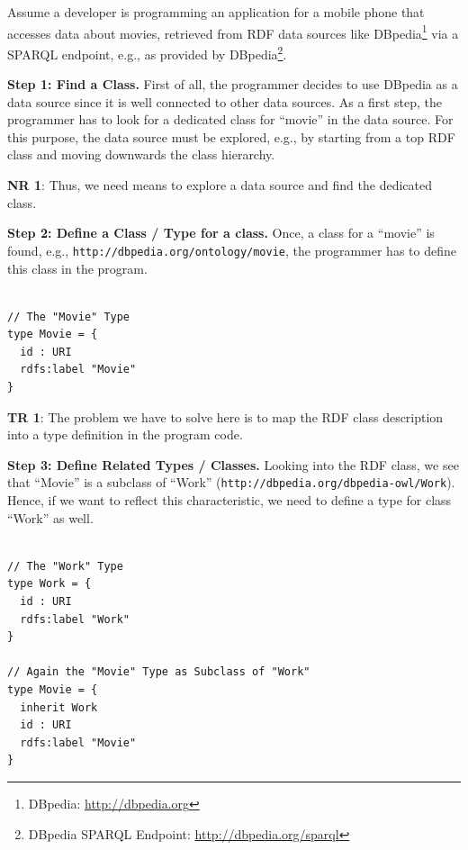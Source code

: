 \documentclass{llncs} %
\newcommand{\nr}[1]{\textbf{NR #1}}
\newcommand{\tr}[1]{\textbf{TR #1}}
\begin{document}
Assume a developer is programming an application for a mobile phone that accesses data about movies, retrieved
from RDF data sources like DBpedia\footnote{DBpedia: \url{http://dbpedia.org}} via a SPARQL endpoint,
e.g., as provided by DBpedia\footnote{DBpedia SPARQL Endpoint: \url{http://dbpedia.org/sparql}}.

\vspace{0.8em}
\noindent
\textbf{Step 1: Find a Class.}
First of all, the programmer decides to use DBpedia as a data source since it is well connected to other
data sources. As a first step, the programmer has to look for a dedicated class for ``movie'' in the data source.
For this purpose, the data source must be explored, e.g., by starting from a top RDF class and moving downwards the class hierarchy.

\nr{1}: Thus, we need means to explore a data source and find the dedicated class.

\vspace{0.8em}
\noindent
\textbf{Step 2: Define a Class / Type for  a class.}
Once, a class for a ``movie'' is found, e.g., \texttt{http://dbpedia.org/ontology/movie}, the programmer has
to define this class in the program.

\begin{lstlisting}[style=code, caption={Type Definition for RDF Class ``Movie''}, label={lst:movietype}]

// The "Movie" Type
type Movie = {
  id : URI
  rdfs:label "Movie"
}
\end{lstlisting}

\tr{1}: The problem we have to solve here is to map the RDF class description into a type definition in the program code.

\vspace{0.8em}
\noindent
\textbf{Step 3: Define Related Types / Classes.}
Looking into the RDF class, we see that ``Movie'' is a subclass of ``Work'' (\texttt{http://dbpedia.org/dbpedia-owl/Work}).
Hence, if we want to reflect this characteristic, we need to define a type for class ``Work'' as well.

\begin{lstlisting}[style=code, caption={Type Definition for RDF Class ``Movie'' and ``Work''}, label={lst:worktype}]

// The "Work" Type
type Work = {
  id : URI
  rdfs:label "Work"
}

// Again the "Movie" Type as Subclass of "Work"
type Movie = {
  inherit Work
  id : URI
  rdfs:label "Movie"
}
\end{lstlisting}
\end{document}
